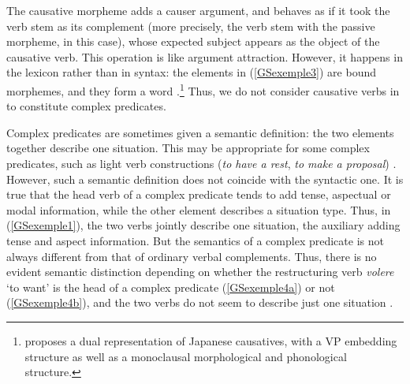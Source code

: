 \z

\noindent
The causative morpheme adds a causer argument, and behaves as if it took the verb stem as its
complement (more precisely, the verb stem with the passive morpheme, in this case), whose expected
subject appears as the object of the causative verb. This operation is like argument
attraction. However, it happens in the lexicon rather than in syntax: the elements in
(\ref{GSexemple3}) are bound morphemes, and they form a word
\parencites{manning1999lexical}.\footnote{
  \citet{Gunji99a-u} proposes a dual representation of Japanese causatives, with a VP embedding structure
  as well as a monoclausal morphological and phonological structure.
} Thus, we do not consider
causative verbs in  to constitute complex predicates.


Complex predicates are sometimes given a semantic definition: the two elements together describe one
situation. This may be appropriate for some complex predicates, such as light verb constructions (\emph{to have a rest}, \emph{to make a proposal}) \citep[71--74]{Butt2010a}. However, such a semantic definition does not coincide with the syntactic one. It is true that the head verb of a complex predicate tends to add tense, aspectual or modal information, while the other element describes a situation type. Thus, in (\ref{GSexemple1}), the two verbs jointly describe one situation, the auxiliary adding tense and aspect information. But the semantics of a complex predicate is not always different from that of ordinary verbal complements. Thus, there is no evident semantic distinction depending on whether the  restructuring verb \emph{volere} `to want' is the head of a complex predicate (\ref{GSexemple4a}) or not (\ref{GSexemple4b}), and the two verbs do not seem to describe just one situation \citep[314]{Monachesi98a}.  

\eal 
	\label{GSexemple4} 
	\label{GSexemple4a}
		
	\label{GSexemple4b} 
\zl


